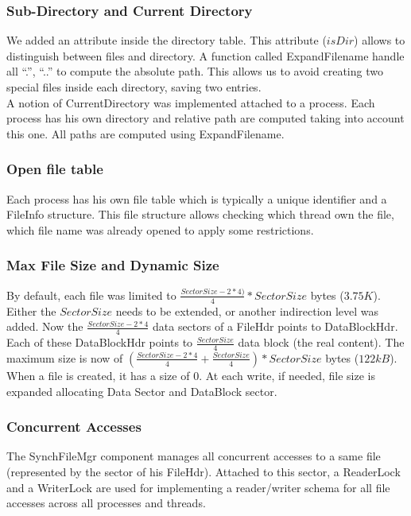 \subsubsection{Sub-Directory and Current Directory}

We added an attribute inside the directory table. This attribute ($isDir$) allows
to distinguish between files and directory. A function called
\textrm{ExpandFilename} handle all ``.'', ``..'' to compute the absolute
path. This allows us to avoid creating two special files inside each directory,
saving two entries.\\

A notion of CurrentDirectory was implemented attached to a process. Each process
has his own directory and relative path are computed taking into account this
one. All paths are computed using ExpandFilename.

\subsubsection{Open file table}
Each process has his own file table which is typically a unique identifier and a
FileInfo structure. This file structure allows checking which thread own the
file, which file name was already opened to apply some restrictions.

\subsubsection{Max File Size and Dynamic Size}
By default, each file was limited to $\frac{SectorSize - 2*4)}{4} * SectorSize$
bytes ($3.75K$). Either the $SectorSize$ needs to be extended, or another
indirection level was added.
Now the $\frac{SectorSize - 2*4}{4}$ data sectors of a FileHdr points to
DataBlockHdr. Each of these DataBlockHdr points to $\frac{SectorSize}{4}$ data
block (the real content).
The maximum size is now of $(\frac{SectorSize - 2*4}{4} +
\frac{SectorSize}{4})*SectorSize$ bytes ($122kB$).\\

When a file is created, it has a size of $0$. At each write, if needed, file size is
expanded allocating Data Sector and DataBlock sector.

\subsubsection{Concurrent Accesses}
The SynchFileMgr component manages all concurrent accesses to a same file
(represented by the sector of his FileHdr). Attached to this sector, a
ReaderLock and a WriterLock are used for implementing a reader/writer schema for
all file accesses across all processes and threads.

